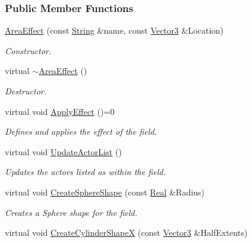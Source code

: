 \subsubsection*{Public Member Functions}
\begin{DoxyCompactItemize}
\item 
\hyperlink{classphys_1_1AreaEffect_aff3adf2220fecc6954cf7b9512390bf5}{AreaEffect} (const \hyperlink{namespacephys_aa03900411993de7fbfec4789bc1d392e}{String} \&name, const \hyperlink{classphys_1_1Vector3}{Vector3} \&Location)
\begin{DoxyCompactList}\small\item\em Constructor. \item\end{DoxyCompactList}\item 
virtual \hyperlink{classphys_1_1AreaEffect_aa9e6d721d337c32aa47357060d319924}{$\sim$AreaEffect} ()
\begin{DoxyCompactList}\small\item\em Destructor. \item\end{DoxyCompactList}\item 
virtual void \hyperlink{classphys_1_1AreaEffect_a3b285ecfcf9c9200662d510e48dd222a}{ApplyEffect} ()=0
\begin{DoxyCompactList}\small\item\em Defines and applies the effect of the field. \item\end{DoxyCompactList}\item 
virtual void \hyperlink{classphys_1_1AreaEffect_a0a0e6dfc6353d19b19e7bea037172072}{UpdateActorList} ()
\begin{DoxyCompactList}\small\item\em Updates the actors listed as within the field. \item\end{DoxyCompactList}\item 
virtual void \hyperlink{classphys_1_1AreaEffect_a5a4337e4b7a01b9b4d16a5e8bbdec1c8}{CreateSphereShape} (const \hyperlink{namespacephys_af7eb897198d265b8e868f45240230d5f}{Real} \&Radius)
\begin{DoxyCompactList}\small\item\em Creates a Sphere shape for the field. \item\end{DoxyCompactList}\item 
virtual void \hyperlink{classphys_1_1AreaEffect_a3b5e2da0598ded89ccdf2dee80441336}{CreateCylinderShapeX} (const \hyperlink{classphys_1_1Vector3}{Vector3} \&HalfExtents)

\end{DoxyCompactItemize}
